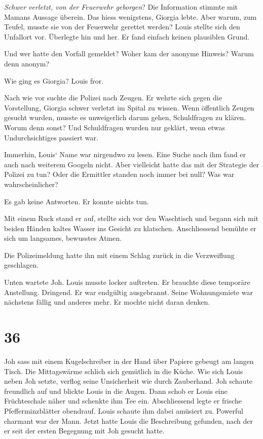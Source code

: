 \emph{Schwer verletzt, von der Feuerwehr geborgen}? Die Information
stimmte mit Mamans Aussage überein. Das hiess wenigstens, Giorgia lebte.
Aber warum, zum Teufel, musste sie von der Feuerwehr gerettet werden?
Louis stellte sich den Unfallort vor. Überlegte hin und her. Er fand
einfach keinen plausiblen Grund.

Und wer hatte den Vorfall gemeldet? Woher kam der anonyme Hinweis? Warum
denn anonym?

Wie ging es Giorgia? Louis fror.

Nach wie vor suchte die Polizei nach Zeugen. Er wehrte sich gegen die
Vorstellung, Giorgia schwer verletzt im Spital zu wissen. Wenn
öffentlich Zeugen gesucht wurden, musste es unweigerlich darum gehen,
Schuldfragen zu klären. Worum denn sonst? Und Schuldfragen wurden nur
geklärt, wenn etwas Undurchsichtiges passiert war.

Immerhin, Louis` Name war nirgendwo zu lesen. Eine Suche nach ihm fand
er auch nach weiterem Googeln nicht. Aber vielleicht hatte das mit der
Strategie der Polizei zu tun? Oder die Ermittler standen noch immer bei
null? Was war wahrscheinlicher?

Es gab keine Antworten. Er konnte nichts tun.

Mit einem Ruck stand er auf, stellte sich vor den Waschtisch und begann
sich mit beiden Händen kaltes Wasser ins Gesicht zu klatschen.
Anschliessend bemühte er sich um langsames, bewusstes Atmen.

Die Polizeimeldung hatte ihn mit einem Schlag zurück in die Verzweiflung
geschlagen.

Unten wartete Joh. Louis musste locker auftreten. Er brauchte diese
temporäre Anstellung. Dringend. Er war endgültig ausgebrannt. Seine
Wohnungsmiete war nächstens fällig und anderes mehr. Er mochte nicht
daran denken.

\chapter{36}\label{section-35}

Joh sass mit einem Kugelschreiber in der Hand über Papiere gebeugt am
langen Tisch. Die Mittagswärme schlich sich gemütlich in die Küche. Wie
sich Louis neben Joh setzte, verflog seine Unsicherheit wie durch
Zauberhand. Joh schaute freundlich auf und blickte Louis in die Augen.
Dann schob er Louis eine Früchteschale näher und schenkte ihm Tee ein.
Abschliessend legte er frische Pfefferminzblätter obendrauf. Louis
schaute ihm dabei amüsiert zu. Powerful charmant war der Mann. Jetzt
hatte Louis die Beschreibung gefunden, nach der er seit der ersten
Begegnung mit Joh gesucht hatte.

